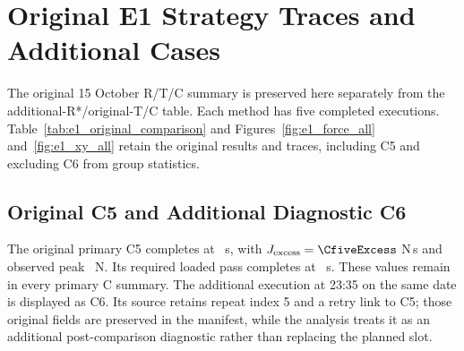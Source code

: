 \section{Original E1 Strategy Traces and Additional Cases}
\label{app:execution_cases}
The original 15 October R/T/C summary is preserved here separately from the additional-R*/original-T/C table. Each method has five completed executions. Table~\ref{tab:e1_original_comparison} and Figures~\ref{fig:e1_force_all} and~\ref{fig:e1_xy_all} retain the original results and traces, including C5 and excluding C6 from group statistics.

\begin{table}[tbp]\centering\footnotesize
\caption[Original 15 October E1 comparison]{Original R/T/C comparison on 15 October 2026; mean \(\pm\) sample SD, \(n=5\). This table preserves the original cohort and is not pooled with additional \(R^{*}\).}
\label{tab:e1_original_comparison}
\end{table}


\subsection{Original C5 and Additional Diagnostic C6}
The original primary C5 completes at \CfiveTime~s, with \(J_{\mathrm{excess}}=\CfiveExcess\) N\,s and observed peak \CfivePeak~N. Its required loaded pass completes at \CfivePass~s. These values remain in every primary C summary. The additional execution at 23:35 on the same date is displayed as C6. Its source retains repeat index 5 and a retry link to C5; those original fields are preserved in the manifest, while the analysis treats it as an additional post-comparison diagnostic rather than replacing the planned slot.

\begin{table}[tbp]\centering\footnotesize
\caption[Original C5 and additional diagnostic C6]{Individual E1 executions with the same recorded evaluator. C5 belongs to the original primary five; C6 is additional diagnostic evidence. Times are relative to each execution start. Single-run values are shown without mean or SD.}
\label{tab:e1_c5_c6}
\end{table}

